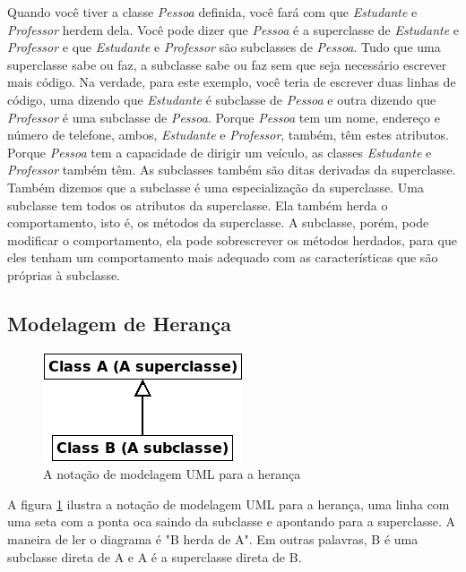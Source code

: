 Quando você tiver a classe \emph{Pessoa} definida, você fará com que \emph{Estudante} e \emph{Professor} herdem dela. Você pode dizer que \emph{Pessoa} é a superclasse de \emph{Estudante} e \emph{Professor} e que \emph{Estudante} e \emph{Professor} são subclasses de \emph{Pessoa}. Tudo que uma superclasse sabe ou faz, a subclasse sabe ou faz sem que seja necessário escrever mais código. Na verdade, para este exemplo, você teria de escrever duas linhas de código, uma dizendo que \emph{Estudante} é subclasse de \emph{Pessoa} e outra dizendo que \emph{Professor} é uma subclasse de \emph{Pessoa}. Porque \emph{Pessoa} tem um nome, endereço e número de telefone, ambos, \emph{Estudante} e \emph{Professor}, também, têm estes atributos. Porque \emph{Pessoa} tem a capacidade de dirigir um veículo, as classes \emph{Estudante} e \emph{Professor} também têm. As subclasses também são ditas derivadas da superclasse. Também dizemos que a subclasse é uma especialização da superclasse. Uma subclasse tem todos os atributos da superclasse. Ela também herda o comportamento, isto é, os métodos da superclasse. A subclasse, porém, pode modificar o comportamento, ela pode sobrescrever os métodos herdados, para que eles tenham um comportamento mais adequado com as características que são próprias à subclasse.

\subsection{Modelagem de Herança}

\begin{figure}
\begin{center}
\includegraphics[scale=0.8]{uml1.png} 
\caption{A notação de modelagem UML para a herança} \label{fig:uml1}
\end{center}
\end{figure}

A figura \ref{fig:uml1} ilustra a notação de modelagem UML para a herança, uma linha com uma seta com a ponta oca saindo da subclasse e apontando para a superclasse. A maneira de ler o diagrama é "B herda de A". Em outras palavras, B é uma subclasse direta de A e A é a superclasse direta de B.


